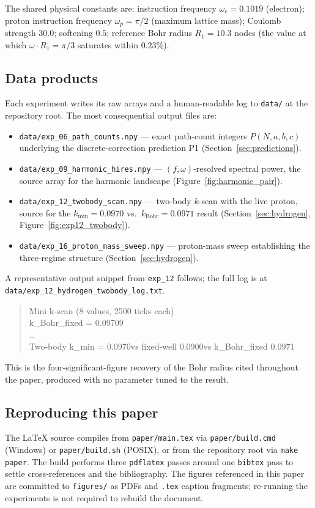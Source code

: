 The shared physical constants are: instruction frequency
$\omega_e = 0.1019$ (electron); proton instruction frequency
$\omega_p = \pi/2$ (maximum lattice mass); Coulomb strength
$30.0$; softening $0.5$; reference Bohr radius
$R_1 = 10.3$ nodes (the value at which $\omega \cdot R_1 = \pi/3$
saturates within $0.23\%$).

\subsection*{Data products}

Each experiment writes its raw arrays and a human-readable log to
\texttt{data/} at the repository root. The most consequential output
files are:

\begin{itemize}
\item \nolinkurl{data/exp_06_path_counts.npy} --- exact path-count
integers $P(N,a,b,c)$ underlying the discrete-correction prediction
P1 (Section~\ref{sec:predictions}).
\item \nolinkurl{data/exp_09_harmonic_hires.npy} ---
$(f,\omega)$-resolved spectral power, the source array for the
harmonic landscape (Figure~\ref{fig:harmonic_pair}).
\item \nolinkurl{data/exp_12_twobody_scan.npy} --- two-body
$k$-scan with the live proton, source for the
$k_\text{min} = 0.0970$ vs.\ $k_\text{Bohr} = 0.0971$ result
(Section~\ref{sec:hydrogen}, Figure~\ref{fig:exp12_twobody}).
\item \nolinkurl{data/exp_16_proton_mass_sweep.npy} --- proton-mass
sweep establishing the three-regime structure
(Section~\ref{sec:hydrogen}).
\end{itemize}

A representative output snippet from \texttt{exp\_12} follows;
the full log is at
\nolinkurl{data/exp_12_hydrogen_twobody_log.txt}.

\begin{quote}\small\ttfamily
[Test 3] Mini k-scan (8 values, 2500 ticks each)\\
\hphantom{xx}k\_Bohr\_fixed = 0.09709\\
\hphantom{xx}\dots\\
Two-body k\_min = 0.0970\quad vs fixed-well 0.0900\quad vs
k\_Bohr\_fixed 0.0971
\end{quote}

This is the four-significant-figure recovery of the Bohr radius
cited throughout the paper, produced with no parameter tuned to the
result.

\subsection*{Reproducing this paper}

The LaTeX source compiles from \texttt{paper/main.tex} via
\texttt{paper/build.cmd} (Windows) or \texttt{paper/build.sh} (POSIX),
or from the repository root via \texttt{make paper}. The build
performs three \texttt{pdflatex} passes around one \texttt{bibtex}
pass to settle cross-references and the bibliography.
The figures referenced in this paper are committed to
\texttt{figures/} as PDFs and \texttt{.tex} caption fragments;
re-running the experiments is not required to rebuild the document.
